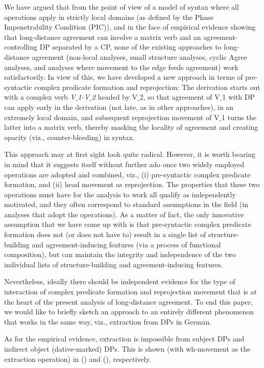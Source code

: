 \documentclass[output=paper
,modfonts
,nonflat]{langsci/langscibook}
\begin{document}
We have argued that from the point of view of a model of syntax where
all operations apply in strictly local domains (as defined by the
Phase Impenetrability Condition (PIC)), and in the face of empirical
evidence showing that long-distance agreement can involve a matrix
verb and an agreement-controlling DP separated by a CP, none of the
existing approaches to long-distance agreement (non-local analyses,
small structure analyses, cyclic Agree analyses, and analyses where
movement to the edge feeds agreement) work satisfactorily. In view of
this, we have developed a new approach in terms of pre-syntactic
complex predicate formation and reprojection: The derivation starts
out with a complex verb {\itshape V$\_$1-V$\_$2} headed by V$\_$2, so that agreement
of V$\_$1 with DP can apply early in the derivation (not late, as in
other approaches), in an extremely local domain, and subsequent
reprojection movement of V$\_$1 turns the latter into a matrix verb, thereby
masking the locality of agreement and creating opacity (viz.,
counter-bleeding) in syntax.  

This approach may at first sight look quite radical. However, it is
worth bearing in mind that it suggests itself without further ado once
two widely employed operations are adopted and combined, viz., (i)
pre-syntactic complex predicate formation, and (ii) head movement as
reprojection. The properties that these two operations must have for
the analysis to work all qualify as independently motivated, and they
often correspond to standard assumptions in the field (in analyses
that adopt the operations). As a matter of fact, the only innovative
assumption that we have come up with is that pre-syntactic complex
predicate formation does not (or does not have to) result in a single
list of structure-building and agreement-inducing features (via a
process of functional composition), but can maintain the integrity and
independence of the two individual lists of structure-building and
agreement-inducing features.

Nevertheless, ideally there should be independent evidence for the
type of interaction of complex predicate formation and reprojection
movement that is at the heart of the present analysis of long-distance
agreement. To end this paper, we would like to briefly sketch an
approach to an entirely different phenomenon that works in the same
way, viz., extraction from DPs in German. 

As for the empirical evidence, extraction is impossible from subject
DPs and indirect object (dative-marked) DPs. This is shown (with
wh-movement as the extraction operation) in (\Next[a]) and (\Next[b]),
respectively.
\end{document}
